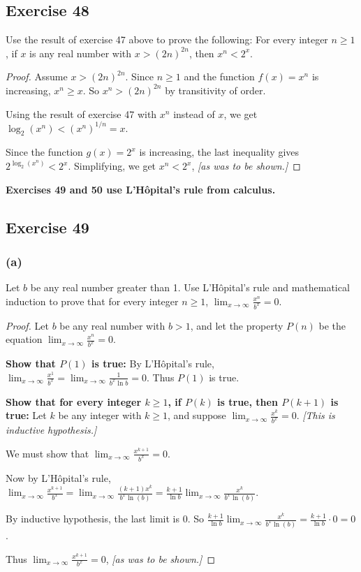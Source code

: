 \documentclass[14pt]{extarticle}
\newcommand{\dps}{\displaystyle}
\newcommand{\cy}{\color{cyan}}
\begin{document}
\subsection{Exercise 48}
Use the result of exercise 47 above to prove the following: For every integer \(n \geq 1\), if \(x\) is any real number
with \(x > (2n)^{2n}\), then \(x^n < 2^x\).

\begin{proof}
    Assume \(x > (2n)^{2n}\). Since \(n \geq 1\) and the function \(f(x) = x^n\) is increasing, \(x^n \geq x\). So
    \(x^n > (2n)^{2n}\) by transitivity of order.

    Using the result of exercise 47 with \(x^n\) instead of \(x\), we get \(\log_2(x^n) < (x^n)^{1/n} = x\).

    Since the function \(g(x) = 2^x\) is increasing, the last inequality gives \(2^{\log_2(x^n)} < 2^x\). Simplifying, we
    get \(x^n < 2^x\), {\it [as was to be shown.]}
\end{proof}

{\bf \cy Exercises 49 and 50 use L’Hôpital’s rule from calculus.}

\subsection{Exercise 49}
\subsubsection{(a)}
Let \(b\) be any real number greater than 1. Use L’Hôpital’s rule and mathematical induction to prove that for every integer \(n \geq 1\), \(\dps \lim_{x \to \infty}\frac{x^n}{b^x} = 0\).

\begin{proof}
    Let \(b\) be any real number with \(b > 1\), and let the property \(P(n)\) be the equation \(\dps \lim_{x \to \infty}
    \frac{x^n}{b^x} = 0\).

        {\bf Show that \(P(1)\) is true:} By L’Hôpital’s rule, \(\dps \lim_{x \to \infty} \frac{x^1}{b^x} = \lim_{x \to \infty}
    \frac{1}{b^x \ln b} = 0\). Thus \(P(1)\) is true.

        {\bf Show that for every integer \(k \geq 1\), if \(P(k)\) is true, then \(P(k + 1)\) is true:} Let \(k\) be any integer
    with \(k \geq 1\), and suppose \(\dps \lim_{x \to \infty}
    \frac{x^k}{b^x} = 0\). {\it [This is inductive hypothesis.]}

    We must show that \(\dps \lim_{x \to \infty}\frac{x^{k+1}}{b^x} = 0\).

    Now by L’Hôpital’s rule, \(\dps \lim_{x \to \infty}\frac{x^{k+1}}{b^x} = \lim_{x \to \infty}\frac{(k+1)x^k}{b^x
        \ln(b)} = \frac{k+1}{\ln b}\lim_{x \to \infty}\frac{x^k}{b^x \ln(b)}\).

    By inductive hypothesis, the last limit is 0. So \(\dps \frac{k+1}{\ln b}\lim_{x \to \infty}\frac{x^k}{b^x \ln(b)} =
    \frac{k+1}{\ln b} \cdot 0 = 0\).

    Thus \(\dps \lim_{x \to \infty}\frac{x^{k+1}}{b^x} = 0\), {\it [as was to be shown.]}
\end{proof}
\end{document}
